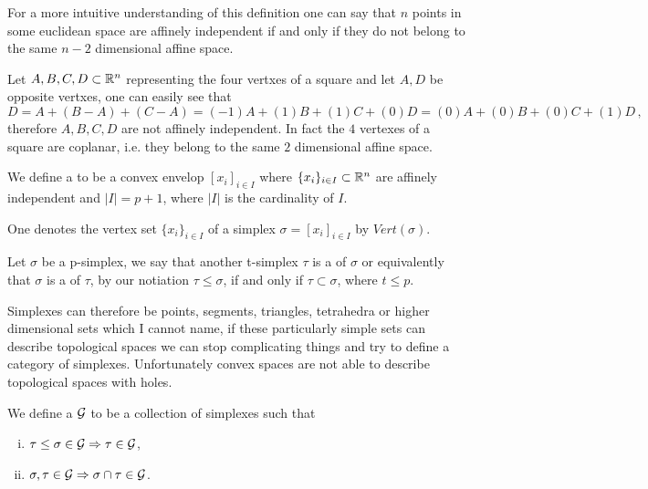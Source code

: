 \documentclass[../1.tex]{subfiles}
\begin{document}
    For a more intuitive understanding of this definition one can say that $n$ points in some euclidean space are affinely independent if and only if they do
    not belong to the same $n-2$ dimensional affine space.

    \begin{exa}
        Let ${A,B,C,D} \subset \mathbb{R}^n$ representing the four vertxes of a square and let $A,D$ be opposite vertxes, one can easily see that 
        \[ D = A + (B-A) + (C-A) = (-1)A + (1)B + (1)C + (0)D = (0)A + (0)B + (0)C + (1)D \, ,\]
        therefore $A,B,C,D$ are not affinely independent.
        In fact the $4$ vertexes of a square are coplanar, i.e. they belong to the same $2$ dimensional affine space.
    \end{exa}

    \begin{defn}
        We define a  to be a convex envelop $[ x_i ]_{i \in I}$
        where $\{x_i\}_{i \in I} \subset \mathbb{R}^n$ are affinely independent and $|I| = p + 1$, where $|I|$ is the cardinality
        of $I$.
    \end{defn}
    
    One denotes the vertex set $\{ x_i \}_{i \in I}$ of a simplex $\sigma = [ x_i ]_{i \in I}$ by $Vert(\sigma)$.
    
    \begin{defn}
        Let $\sigma$ be a p-simplex, we say that another t-simplex $\tau$ is a  of $\sigma$ or equivalently 
        that $\sigma$ is a  of $\tau$, by our notiation $\tau \leq \sigma$, if and only if $\tau \subset \sigma$, where $t \leq p$.
    \end{defn}

    Simplexes can therefore be points, segments, triangles, tetrahedra or higher dimensional sets which I cannot name, if these particularly simple
    sets can describe topological spaces we can stop complicating things and try to define a category of simplexes. Unfortunately convex spaces are
    not able to describe topological spaces with holes.

    \begin{defn}
        We define a  $\mathcal{G}$ to be a collection of simplexes such that
        \begin{enumerate}[(i)]
            \item $ \tau \leq \sigma \in \mathcal{G} \Rightarrow \tau \in \mathcal{G}$,
            \item $ \sigma, \tau \in \mathcal{G} \Rightarrow \sigma \cap \tau \in \mathcal{G}$.
        \end{enumerate}
    \end{defn}
\end{document}
